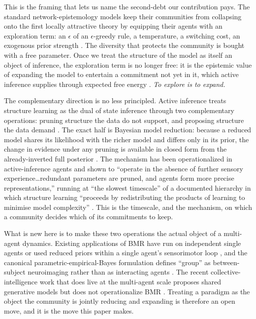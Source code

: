 This is the framing that lets us name the second-debt our contribution pays.
The standard network-epistemology models keep their communities from
collapsing onto the first locally attractive theory by equipping their agents
with an exploration term: an $\epsilon$ of an $\epsilon$-greedy rule, a
temperature, a switching cost, an exogenous prior strength
\citep{zollman2010,oconnor2019}. The diversity that protects the community is
bought with a free parameter. Once we treat the structure of the model as
itself an object of inference, the exploration term is no longer free: it
is the epistemic value of expanding the model to entertain a commitment not
yet in it, which active inference supplies through expected free energy
\citep{friston2015,friston2017curiosity,millidge2021}. \emph{To explore is to
expand.}

The complementary direction is no less principled. Active inference treats
structure learning as the dual of state inference through two complementary
operations: pruning structure the data do not support, and proposing
structure the data demand \citep{friston2017curiosity,smith2020structure}.
The exact half is Bayesian model reduction: because a reduced model shares
its likelihood with the richer model and differs only in its prior, the
change in evidence under any pruning is available in closed form from the
already-inverted full posterior \citep{friston2018bmr}. The mechanism has
been operationalized in active-inference agents and shown to ``operate in the
absence of further sensory experience\dots redundant parameters are pruned,
and agents form more precise representations,'' running at ``the slowest
timescale'' of a documented hierarchy in which structure learning ``proceeds
by redistributing the products of learning to minimise model complexity''
\citep{smith2022plos}. This is the timescale, and the mechanism, on which a
community decides which of its commitments to keep.

What is new here is to make these two operations the actual object of a
multi-agent dynamics. Existing applications of BMR have run on independent
single agents \citep{smith2022plos} or used reduced priors within a single
agent's sensorimotor loop \citep{priorelli2023}, and the canonical
parametric-empirical-Bayes formulation defines ``group'' as between-subject
neuroimaging rather than as interacting agents \citep{friston2016peb}. The
recent collective-intelligence work that does live at the multi-agent scale
proposes shared generative models but does not operationalize BMR
\citep{friston2024ci,kaufmann2021}. Treating a paradigm as the object the
community is jointly reducing and expanding is therefore an open move, and
it is the move this paper makes.

